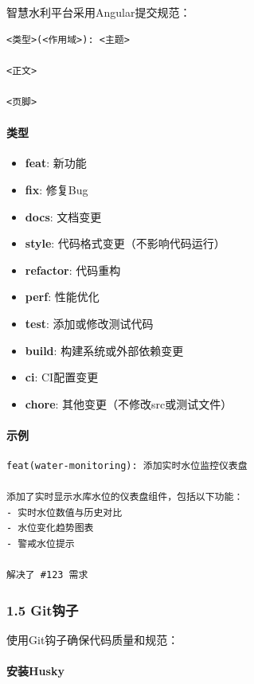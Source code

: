智慧水利平台采用Angular提交规范：

\begin{lstlisting}
<类型>(<作用域>): <主题>

<正文>

<页脚>
\end{lstlisting}

\paragraph{类型}\label{ux7c7bux578b}

\begin{itemize}
\tightlist
\item
  \textbf{feat}: 新功能
\item
  \textbf{fix}: 修复Bug
\item
  \textbf{docs}: 文档变更
\item
  \textbf{style}: 代码格式变更（不影响代码运行）
\item
  \textbf{refactor}: 代码重构
\item
  \textbf{perf}: 性能优化
\item
  \textbf{test}: 添加或修改测试代码
\item
  \textbf{build}: 构建系统或外部依赖变更
\item
  \textbf{ci}: CI配置变更
\item
  \textbf{chore}: 其他变更（不修改src或测试文件）
\end{itemize}

\paragraph{示例}\label{ux793aux4f8b}

\begin{lstlisting}
feat(water-monitoring): 添加实时水位监控仪表盘

添加了实时显示水库水位的仪表盘组件，包括以下功能：
- 实时水位数值与历史对比
- 水位变化趋势图表
- 警戒水位提示

解决了 #123 需求
\end{lstlisting}

\subsubsection{1.5 Git钩子}\label{gitux94a9ux5b50}

使用Git钩子确保代码质量和规范：

\paragraph{安装Husky}\label{ux5b89ux88c5husky}

